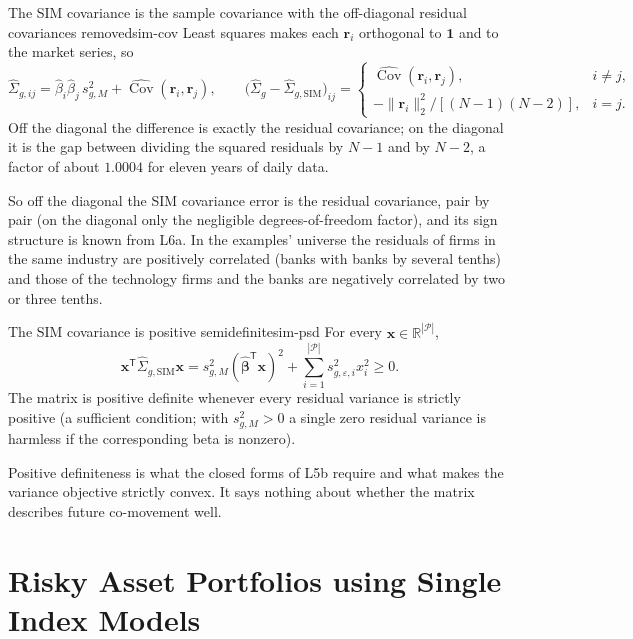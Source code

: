 \documentclass[11pt]{article}
\newcommand{\R}{\mathbb{R}}
\newcommand{\Cov}{\operatorname{Cov}}
\newcommand{\np}{|\mathcal P|}
\newcommand{\bbe}{\boldsymbol\beta}
\newcommand{\br}{\mathbf r}
\newcommand{\SigSIM}{\hat\Sigma_{g,\mathrm{SIM}}}
\begin{document}
\begin{proposition}{The SIM covariance is the sample covariance with the off-diagonal residual covariances removed}{sim-cov}
Least squares makes each $\br_i$ orthogonal to $\mathbf 1$ and to the market series, so
\begin{equation}
  \label{eq:cov-decomposition}
  \hat\Sigma_{g,ij}=\hat\beta_i\hat\beta_j\,s^2_{g,M}+\widehat{\Cov}(\br_i,\br_j),
  \qquad
  \bigl(\hat\Sigma_g-\SigSIM\bigr)_{ij}=
  \begin{cases}
    \widehat{\Cov}(\br_i,\br_j), & i\ne j,\\[1mm]
    -\lVert\br_i\rVert_2^2/[(N-1)(N-2)], & i=j.
  \end{cases}
\end{equation}
Off the diagonal the difference is exactly the residual covariance; on the diagonal it is the gap between dividing the squared residuals by $N-1$ and by $N-2$, a factor of about $1.0004$ for eleven years of daily data.
\end{proposition}

So off the diagonal the SIM covariance error is the residual covariance, pair by pair (on the diagonal only the negligible degrees-of-freedom factor), and its sign structure is known from L6a. In the examples' universe the residuals of firms in the same industry are positively correlated (banks with banks by several tenths) and those of the technology firms and the banks are negatively correlated by two or three tenths.

\begin{proposition}{The SIM covariance is positive semidefinite}{sim-psd}
For every $\mathbf x\in\R^{\np}$,
\begin{equation}
  \label{eq:sim-psd}
  \mathbf x^{\mathsf T}\SigSIM\mathbf x
  =s^2_{g,M}(\hat{\bbe}^{\mathsf T}\mathbf x)^2+\sum_{i=1}^{\np}s^2_{g,\varepsilon,i}x_i^2\geq0 .
\end{equation}
The matrix is positive definite whenever every residual variance is strictly positive (a sufficient condition; with $s^2_{g,M}>0$ a single zero residual variance is harmless if the corresponding beta is nonzero).
\end{proposition}

Positive definiteness is what the closed forms of L5b require and what makes the variance objective strictly convex. It says nothing about whether the matrix describes future co-movement well.

\section{Risky Asset Portfolios using Single Index Models}
\end{document}
